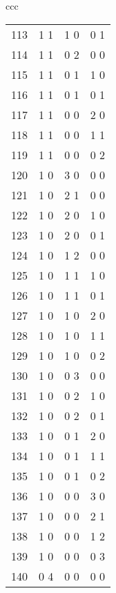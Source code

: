 {\begin{center}
\begin{tabular}{ccc}
\begin{tabular}{rccc}
113\hspace*{.125in}&1 1&1 0&0 1\\
114\hspace*{.125in}&1 1&0 2&0 0\\
115\hspace*{.125in}&1 1&0 1&1 0\\
116\hspace*{.125in}&1 1&0 1&0 1\\
117\hspace*{.125in}&1 1&0 0&2 0\\
118\hspace*{.125in}&1 1&0 0&1 1\\
119\hspace*{.125in}&1 1&0 0&0 2\\
120\hspace*{.125in}&1 0&3 0&0 0\\
121\hspace*{.125in}&1 0&2 1&0 0\\
122\hspace*{.125in}&1 0&2 0&1 0\\
123\hspace*{.125in}&1 0&2 0&0 1\\
124\hspace*{.125in}&1 0&1 2&0 0\\
125\hspace*{.125in}&1 0&1 1&1 0\\
126\hspace*{.125in}&1 0&1 1&0 1\\
127\hspace*{.125in}&1 0&1 0&2 0\\
128\hspace*{.125in}&1 0&1 0&1 1\\
129\hspace*{.125in}&1 0&1 0&0 2\\
130\hspace*{.125in}&1 0&0 3&0 0\\
131\hspace*{.125in}&1 0&0 2&1 0\\
132\hspace*{.125in}&1 0&0 2&0 1\\
133\hspace*{.125in}&1 0&0 1&2 0\\
134\hspace*{.125in}&1 0&0 1&1 1\\
135\hspace*{.125in}&1 0&0 1&0 2\\
136\hspace*{.125in}&1 0&0 0&3 0\\
137\hspace*{.125in}&1 0&0 0&2 1\\
138\hspace*{.125in}&1 0&0 0&1 2\\
139\hspace*{.125in}&1 0&0 0&0 3\\
140\hspace*{.125in}&0 4&0 0&0 0
\end{tabular}
\end{tabular}



\end{center}}
